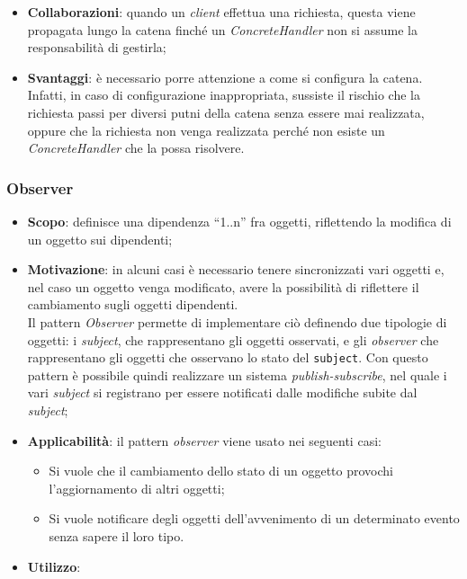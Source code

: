 \begin{itemize}
\item \textbf{Collaborazioni}: quando un \textit{client} effettua una richiesta, questa viene propagata lungo la catena finché un \textit{ConcreteHandler} non si assume la responsabilità di gestirla;
\item \textbf{Svantaggi}: è necessario porre attenzione a come si configura la catena. Infatti, in caso di configurazione inappropriata, sussiste il rischio che la richiesta passi per diversi putni della catena senza essere mai realizzata, oppure che la richiesta non venga realizzata perché non esiste un \textit{ConcreteHandler} che la possa risolvere.
\end{itemize}

\subsubsection{Observer}
\begin{itemize}

\item \textbf{Scopo}: definisce una dipendenza “1..n” fra oggetti, riflettendo la modifica di un oggetto sui dipendenti;

\item \textbf{Motivazione}: in alcuni casi è necessario tenere sincronizzati vari oggetti e, nel caso un oggetto venga modificato, avere la possibilità di riflettere il cambiamento sugli oggetti dipendenti. \\ Il pattern \textit{Observer} permette di implementare ciò definendo due tipologie di oggetti: i \textit{subject}, che rappresentano gli oggetti osservati, e gli \textit{observer} che rappresentano gli oggetti che osservano lo stato del \texttt{subject}. Con questo pattern è possibile quindi realizzare un sistema \textit{publish-subscribe}, nel quale i vari \textit{subject} si registrano per essere notificati dalle modifiche subite dal \textit{subject};

\item \textbf{Applicabilità}: il pattern \textit{observer} viene usato nei seguenti casi:
	\begin{itemize}
		\item Si vuole che il cambiamento dello stato di un oggetto provochi l'aggiornamento di altri oggetti;
		\item Si vuole notificare degli oggetti dell'avvenimento di un determinato evento senza sapere il loro tipo.
	\end{itemize}

\item \textbf{Utilizzo}:
\end{itemize}